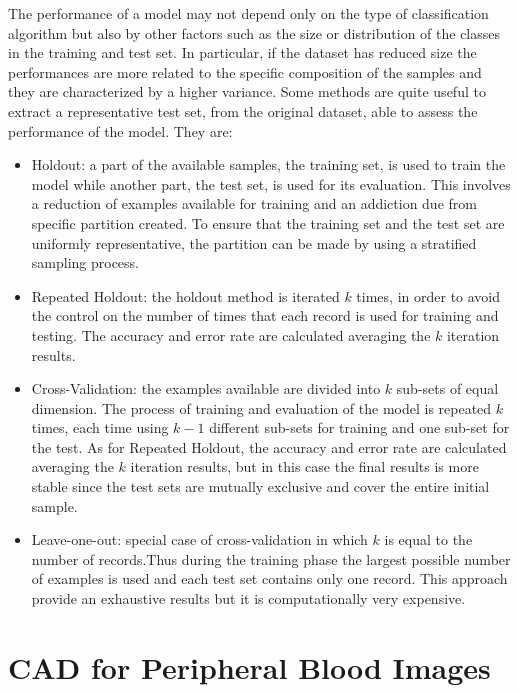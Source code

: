 \documentclass[final,a4paper,12pt,english]{UnicaPhdThesis3}
\begin{document}
	The performance of a model may not depend only on the type of classification algorithm but also by other factors such as the size or distribution of the classes in the training and test set. In particular, if the dataset has reduced size the performances are more related to the specific composition of the samples and they are characterized by a higher variance. Some methods are quite useful to extract a representative test set, from the original dataset, able to assess the performance of the model. They are:
	\begin{itemize}
		\item Holdout: a part of the available samples, the training set, is used to train the model while another part, the test set, is used for its evaluation. This involves a reduction of examples available for training and an addiction due from specific partition created. To ensure that the training set and the test set are uniformly representative, the partition can be made by using a stratified sampling process.
		\item Repeated Holdout: the holdout method is iterated $k$ times, in order to avoid the control on the number of times that each record is used for training and testing. The accuracy and error rate are calculated averaging the $k$ iteration results.
		\item Cross-Validation: the examples available are divided into $k$ sub-sets of equal dimension. The process of training and evaluation of the model is repeated $k$ times, each time using $k-1$ different sub-sets for training and one sub-set
		for the test. As for Repeated Holdout, the accuracy and error rate are calculated averaging the $k$ iteration results, but in this case the final results is more stable since the test sets are mutually exclusive and cover the entire initial sample.
		\item Leave-one-out: special case of cross-validation in which $k$ is equal to the number of records.Thus during the training phase the largest possible number of examples is used and each test set contains only one record. This approach provide an exhaustive results but it is computationally very expensive.
	\end{itemize}
	
	
	\part{CAD for Peripheral Blood Images} \label{due}
	
\end{document}

